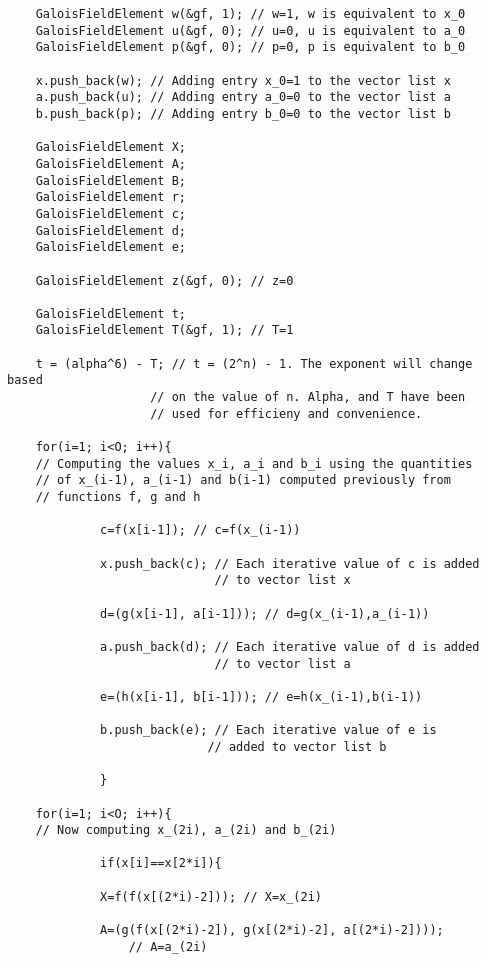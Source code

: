 \documentclass[iwp,first]{luthesis}
\begin{document}
\begin{verbatim}
	GaloisFieldElement w(&gf, 1); // w=1, w is equivalent to x_0
	GaloisFieldElement u(&gf, 0); // u=0, u is equivalent to a_0
	GaloisFieldElement p(&gf, 0); // p=0, p is equivalent to b_0

    x.push_back(w); // Adding entry x_0=1 to the vector list x
    a.push_back(u); // Adding entry a_0=0 to the vector list a
    b.push_back(p); // Adding entry b_0=0 to the vector list b
    
    GaloisFieldElement X;
    GaloisFieldElement A;
    GaloisFieldElement B;
    GaloisFieldElement r;
    GaloisFieldElement c;
    GaloisFieldElement d;
    GaloisFieldElement e;
    
	GaloisFieldElement z(&gf, 0); // z=0
    
	GaloisFieldElement t;
	GaloisFieldElement T(&gf, 1); // T=1
	
	t = (alpha^6) - T; // t = (2^n) - 1. The exponent will change based 
				    // on the value of n. Alpha, and T have been
				    // used for efficieny and convenience.

    for(i=1; i<O; i++){
    // Computing the values x_i, a_i and b_i using the quantities 
    // of x_(i-1), a_(i-1) and b(i-1) computed previously from 
    // functions f, g and h         
             
             c=f(x[i-1]); // c=f(x_(i-1))
             
             x.push_back(c); // Each iterative value of c is added 
                             // to vector list x
             
             d=(g(x[i-1], a[i-1])); // d=g(x_(i-1),a_(i-1))

             a.push_back(d); // Each iterative value of d is added 
                             // to vector list a
             
             e=(h(x[i-1], b[i-1])); // e=h(x_(i-1),b(i-1))

             b.push_back(e); // Each iterative value of e is 
                            // added to vector list b

             }
             
    for(i=1; i<O; i++){
    // Now computing x_(2i), a_(2i) and b_(2i)
            
             if(x[i]==x[2*i]){
            
             X=f(f(x[(2*i)-2])); // X=x_(2i)
             
             A=(g(f(x[(2*i)-2]), g(x[(2*i)-2], a[(2*i)-2]))); 
	             // A=a_(2i)
        

\end{verbatim}
\end{document}
